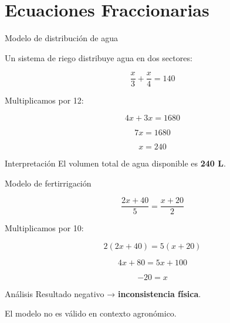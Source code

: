\documentclass[10pt]{beamer}
\newcommand{\pp}{\pause}
\begin{document}
	
	
	
	
	
	
	
	
	
	\section{Ecuaciones Fraccionarias}
	
	\begin{frame}{Modelo de distribución de agua}
		
		Un sistema de riego distribuye agua en dos sectores:
		
		\[
		\frac{x}{3} + \frac{x}{4} = 140
		\]
		
		\pp
		
		Multiplicamos por 12:
		
		\[
		4x + 3x = 1680
		\]
		
		\pp
		
		\[
		7x = 1680
		\]
		
		\pp
		
		\[
		x = 240
		\]
		
		\pp
		
		\begin{block}{Interpretación}
			El volumen total de agua disponible es \textbf{240 L}.
		\end{block}
		
	\end{frame}
	
	\begin{frame}{Modelo de fertirrigación}
		
		\[
		\frac{2x + 40}{5} = \frac{x + 20}{2}
		\]
		
		\pp
		
		Multiplicamos por 10:
		
		\[
		2(2x + 40) = 5(x + 20)
		\]
		
		\pp
		
		\[
		4x + 80 = 5x + 100
		\]
		
		\pp
		
		\[
		-20 = x
		\]
		
		\pp
		
		\begin{block}{Análisis}
			Resultado negativo → \textbf{inconsistencia física}.
			
			El modelo no es válido en contexto agronómico.
		\end{block}
		
	\end{frame}
	
\end{document}
